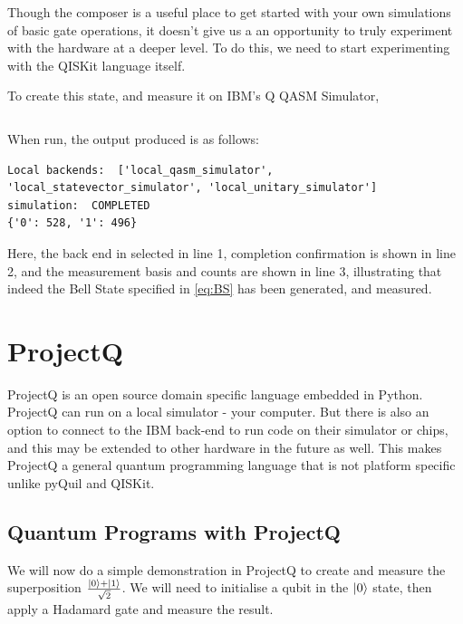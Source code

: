 Though the composer is a useful place to get started with your own simulations of basic gate operations, it doesn't give us a an opportunity to truly experiment with the hardware at a deeper level. To do this, we need to start experimenting with the QISKit language itself.

To create this state, and measure it on IBM's Q QASM Simulator,

\inputminted{python}{code/QISKit/superpos_qiskit.txt}

When run, the output produced is as follows:

\begin{verbatim} 
Local backends:  ['local_qasm_simulator', 'local_statevector_simulator', 'local_unitary_simulator']
simulation:  COMPLETED
{'0': 528, '1': 496}
\end{verbatim}

Here, the back end in selected in line 1, completion confirmation is shown in line 2, and the measurement basis and counts are shown in line 3, illustrating that indeed the Bell State specified in \autoref{eq:BS} has been generated, and measured. 

\section{ProjectQ}

ProjectQ is an open source domain specific language embedded in Python. ProjectQ can run on a local simulator - your computer. But there is also an option to connect to the IBM back-end to run code on their simulator or chips, and this may be extended to other hardware in the future as well. This makes ProjectQ a general quantum programming language that is not platform specific unlike pyQuil and QISKit.  




\subsection{Quantum Programs with ProjectQ}


We will now do a simple demonstration in ProjectQ to create and measure the superposition $\frac{\left\vert{0}\right\rangle+\left\vert{1}\right\rangle}{\sqrt{2}}$. We will need to initialise a qubit in the $\left\vert{0}\right\rangle$ state, then apply a Hadamard gate and measure the result.

